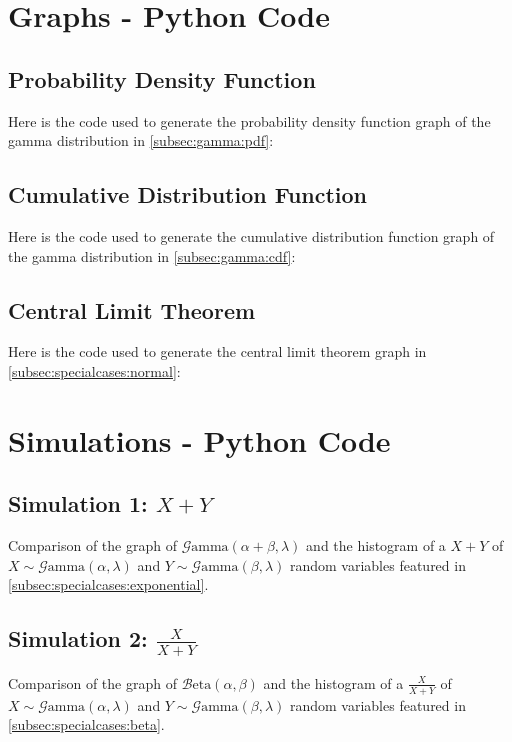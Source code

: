 \documentclass[12pt]{article}
\newcommand{\B}{\mathcal{B}}
\newcommand{\G}{\mathcal{G}}
\begin{document}
\begin{appendix}
\section{Graphs - Python Code}
\subsection{Probability Density Function}
Here is the code used to generate the probability density function graph of the gamma distribution in
\autoref{subsec:gamma:pdf}:


\pagebreak
\subsection{Cumulative Distribution Function}
Here is the code used to generate the cumulative distribution function graph of the gamma distribution in
\autoref{subsec:gamma:cdf}:


\pagebreak
\subsection{Central Limit Theorem}
Here is the code used to generate the central limit theorem graph in \autoref{subsec:specialcases:normal}:


\pagebreak
\section{Simulations - Python Code}
\subsection{Simulation 1: $X+Y$}
Comparison of the graph of $\G\text{amma}(\alpha+\beta, \lambda)$ and the histogram of a $X+Y$ of
$X\sim\G\text{amma}(\alpha, \lambda)$ and $Y\sim\G\text{amma}(\beta, \lambda)$ random variables featured in
\autoref{subsec:specialcases:exponential}.


\pagebreak
\subsection{Simulation 2: $\frac{X}{X+Y}$}
Comparison of the graph of $\B\text{eta}(\alpha, \beta)$ and the histogram of a $\frac{X}{X+Y}$ of
$X\sim\G\text{amma}(\alpha, \lambda)$ and $Y\sim\G\text{amma}(\beta, \lambda)$ random variables featured in
\autoref{subsec:specialcases:beta}.


\pagebreak
{}\listoffigures
\end{appendix}

\pagebreak{}\printbibliography[heading=bibintoc, title={References}]
\end{document}
